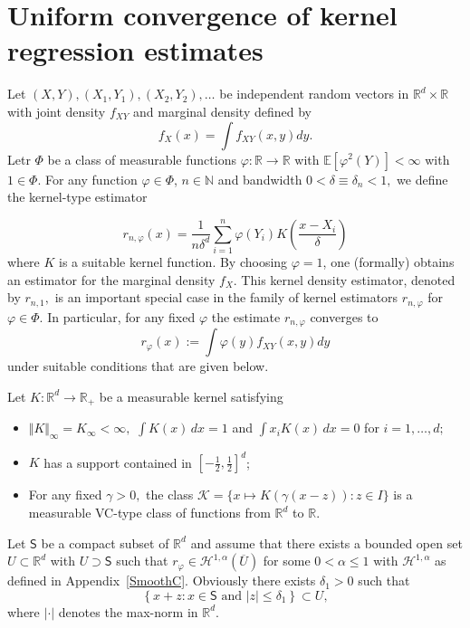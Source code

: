 \documentclass[a4paper,11pt]{amsart}
\theoremstyle{plain}
\theoremstyle{remark}
\begin{document}
\section{Uniform convergence of kernel regression estimates}

Let $(X,Y),(X_{1},Y_{1}),(X_{2},Y_{2}),\dots$ be independent random vectors in
$\mathbb{R}^{d}\times\mathbb{R}$ with joint density $f_{XY}$ and marginal
density defined by%
\[
f_{X}(x)=\int f_{XY}(x,y)dy.
\]
Letr $\Phi$ be a class of measurable functions $\varphi:\mathbb{R}%
\rightarrow\mathbb{R}$ with $\mathbb{E}[\varphi^{2}(Y)]<\infty$ with $1\in
\Phi$. For any function $\varphi\in\Phi$, $n\in\mathbb{N}$ and bandwidth
$0<\delta\equiv\delta_{n}<1,$ we define the kernel-type estimator%

\[
r_{n,\varphi}(x)=\frac{1}{n\delta^{d}}\sum_{i=1}^{n}\varphi(Y_{i})K\left(
\frac{x-X_{i}}{\delta}\right)
\]
where $K$ is a suitable kernel function. By choosing $\varphi=1$, one
(formally) obtains an estimator for the marginal density $f_{X}.$ This kernel
density estimator, denoted by $r_{n,1},$ is an important special case in the
family of kernel estimators $r_{n,\varphi}$ for $\varphi\in\Phi$. In
particular, for any fixed $\varphi$ the estimate $r_{n,\varphi}$ converges to
\[
r_{\varphi}(x):=\int\varphi(y)f_{XY}(x,y)dy
\]
under suitable conditions that are given below.

Let $K:\mathbb{R}^{d}\rightarrow\mathbb{R}_{+}$ be a measurable kernel satisfying

\begin{itemize}
\item $\Vert K\Vert_{\infty}=K_{\infty}<\infty,$ $\int K(x)\,dx=1$ and $\int
x_{i}K(x)\,dx=0$ for $i=1,\ldots,d;$

\item $K$ has a support contained in $\left[  -\frac{1}{2},\frac{1}{2}\right]
^{d}$;

\item For any fixed $\gamma>0,$ the class $\mathcal{K}=\{x\mapsto
K(\gamma(x-z)):z\in I\}$ is a measurable VC-type class of functions from
$\mathbb{R}^{d}$ to $\mathbb{R}$.
\end{itemize}

Let $\mathsf{S}$ be a compact subset of $\mathbb{R}^{d}$\textsf{ and }assume
that there exists a bounded open set $U\subset\mathbb{R}^{d}$ with
$U\supset\mathsf{S}$ such that $r_{\varphi}\in\mathcal{H}^{1,\alpha}%
(\overline{U})$ for some $0<\alpha\leq1$
with $\mathcal{H}^{1,\alpha}$ as defined in Appendix~\ref{SmoothC}. Obviously there exists $\delta
_{1}>0$ such that%
\[
\left\{  x+z:x\in\mathsf{S}\text{ and }\left\vert z\right\vert \leq\delta
_{1}\right\}  \subset U,
\]
where $\left\vert \cdot\right\vert $ denotes the max-norm in $\mathbb{R}^{d}.$
\end{document}
